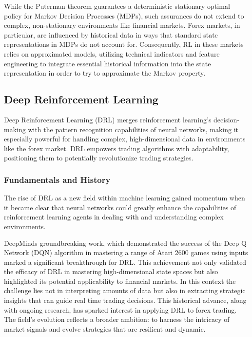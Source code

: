 

While the Puterman theorem guarantees a deterministic stationary optimal policy for Markov Decision Processes (MDPs), such assurances do not extend to complex, non-stationary environments like financial markets. Forex markets, in particular, are influenced by historical data in ways that standard state representations in MDPs do not account for. Consequently, RL in these markets relies on approximated models, utilizing technical indicators and feature engineering to integrate essential historical information into the state representation in order to try to approximate the Markov property.

\subsection{Deep Reinforcement Learning}
Deep Reinforcement Learning (DRL) merges reinforcement learning's decision-making with the pattern recognition capabilities of neural networks, making it especially powerful for handling complex, high-dimensional data in environments like the forex market. DRL empowers trading algorithms with adaptability, positioning them to potentially revolutionize trading strategies.

\subsubsection{Fundamentals and History}
The rise of DRL as a new field within machine learning gained momentum when it became clear that neural networks could greatly enhance the capabilities of reinforcement learning agents in dealing with and understanding complex environments.

DeepMinds groundbreaking work, which demonstrated the success of the Deep Q Network (DQN) algorithm in mastering a range of Atari 2600 games using inputs marked a significant breakthrough for DRL. This achievement not only validated the efficacy of DRL in mastering high-dimensional state spaces but also highlighted its potential applicability to financial markets. In this context the challenge lies not in interpreting amounts of data but also in extracting strategic insights that can guide real time trading decisions. This historical advance, along with ongoing research, has sparked interest in applying DRL to forex trading. The field's evolution reflects a broader ambition: to harness the intricacy of market signals and evolve strategies that are resilient and dynamic.

